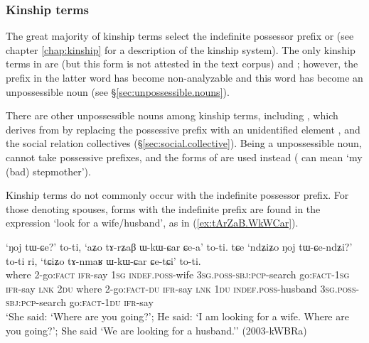 \subsubsection{Kinship terms} \label{sec:kinship}
The great majority of kinship terms select the indefinite possessor prefix  or  (see chapter \ref{chap:kinship} for a description of the kinship system). The only kinship terms in  are  (but this form is not attested in the text corpus) and ; however, the  prefix in the latter word has become non-analyzable and this word has become an unpossessible noun (see §\ref{sec:unpossessible.nouns}). 

There are other unpossessible nouns among kinship terms, including , which derives from  by replacing the possessive prefix with an unidentified element , and the social relation collectives (§\ref{sec:social.collective}). Being a unpossessible noun,  cannot take possessive prefixes, and the forms of  are used instead ( can mean `my (bad) stepmother').

Kinship terms do not commonly occur with the indefinite possessor prefix. For those denoting spouses, forms with the indefinite prefix are found in the expression `look for a wife/husband', as in (\ref{ex:tArZaB.WkWCar}).
 
\begin{exe}
\ex \label{ex:tArZaB.WkWCar}
 \gll `ŋoj tɯ-ɕe?' to-ti, `aʑo tɤ-rʑaβ ɯ-kɯ-ɕar ɕe-a' to-ti. tɕe `ndʑiʑo ŋoj tɯ-ɕe-ndʑi?' to-ti ri, `tɕiʑo tɤ-nmaʁ ɯ-kɯ-ɕar ɕe-tɕi' to-ti. \\
 where 2-go:\textsc{fact} \textsc{ifr}-say \textsc{1sg} \textsc{indef}.\textsc{poss}-wife \textsc{3sg}.\textsc{poss}-\textsc{sbj}:\textsc{pcp}-search go:\textsc{fact}-\textsc{1sg} \textsc{ifr}-say \textsc{lnk} \textsc{2du} where 2-go:\textsc{fact}-\textsc{du} \textsc{ifr}-say \textsc{lnk} \textsc{1du} \textsc{indef}.\textsc{poss}-husband \textsc{3sg}.\textsc{poss}-\textsc{sbj}:\textsc{pcp}-search go:\textsc{fact}-\textsc{1du} \textsc{ifr}-say  \\
 \glt `She said: `Where are you going?'; He said: `I am looking for a wife. Where are you going?'; She said `We are looking for a husband.'' (2003-kWBRa)
\end{exe}

